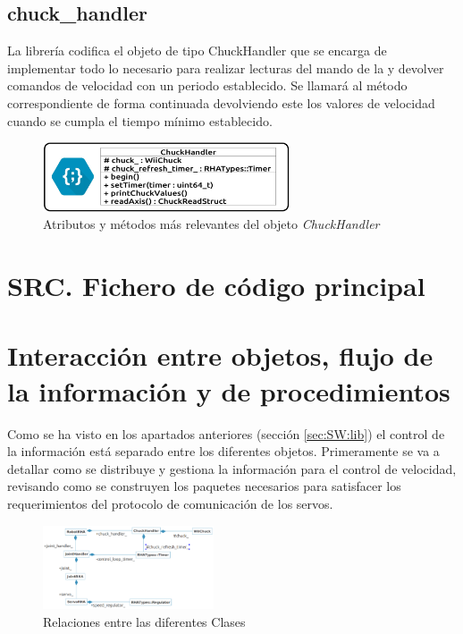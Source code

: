     \subsection{chuck\_handler} \label{subsec:SW:lib:chuck_handler}
        La librería  codifica el objeto de tipo ChuckHandler que se encarga de implementar todo lo necesario para realizar lecturas del mando  de la  y devolver comandos de velocidad con un periodo establecido. Se llamará al método correspondiente de forma continuada devolviendo este los valores de velocidad cuando se cumpla el tiempo mínimo establecido.

        \begin{figure}[H]
          	\centering
          	\includegraphics[width=0.65\textwidth]{figuras/Imagenes_SW/class_diagram_CHH.jpg}
          	\caption{Atributos y métodos más relevantes del objeto \textit{ChuckHandler}}
          	\label{fig:SW:class_diagram_CHH}
        \end{figure}

\section{SRC. Fichero de código principal} \label{sec:SW:src}

\section{Interacción entre objetos, flujo de la información y de procedimientos} \label{sec:SW:interacion_informacion_proced}

	Como se ha visto en los apartados anteriores (sección \ref{sec:SW:lib}) el control de la información está separado entre los diferentes objetos. Primeramente se va a detallar como se distribuye y gestiona la información para el control de velocidad, revisando como se construyen los paquetes necesarios para satisfacer los requerimientos del protocolo de comunicación de los servos.
	\\

	\begin{figure}[H]
		\centering
		\includegraphics[width=0.45\textwidth]{figuras/Imagenes_SW/class_relation.png}
		\caption{Relaciones entre las diferentes Clases }
		\label{fig:SW:class_relation}
	\end{figure}

